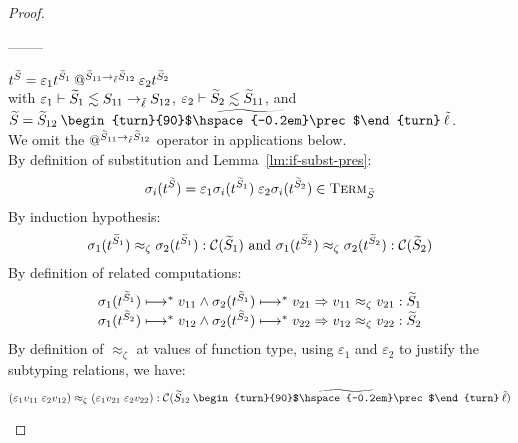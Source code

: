 \documentclass[authoryear,sort&compress,9pt,twocolumn,nocopyrightspace]{sigplanconf}
\makeatletter
\newcommand{\oblset}[1]{\textsc{#1}}
\newcommand{\csub}{\lesssim}
\newcommand{\?}{\textsf{\upshape ?}} \newcommand{\consistent}[1]{\widetilde{#1}}
\newcommand{\ljoincore}{\begin{turn}{90}$\hspace{-0.2em}\prec$\end{turn}}
\newcommand{\cjoin}{\mathbin{\consistent{\ljoincore}}}
\newcommand{\cljoin}{\cjoin}
\newcommand{\TermT}[1]{\oblset{Term}_{#1}}
\newcommand{\cast}[2]{\evcast{\evpr{#1}}{#2}}
\newcommand{\red}{\longmapsto}
\newcommand{\iapp}[1]{\mathbin{@^{#1}}}
\newcommand{\ev}{\varepsilon}
\newcommand{\evcast}[2]{#1#2}
\newcommand{\evpr}[1]{\braket{#1}}
\newcommand{\lobs}{\zeta}
\newcommand{\rel}{\approx_{\lobs}}
\newcommand{\rcomp}[1]{\mathcal{C}(#1)}
\newcommand{\subst}{\sigma}
\newcommand{\itm}[1]{{t^{\cS_{#1}}}}
\renewcommand{\cast}[2]{#1#2}
\makeatother
\begin{document}
\begin{proof}
\begin{case}[$\oplus$]
\end{case}

\begin{center}--------\end{center}
\begin{case}[app]

$\itm{} = \cast{\ev_1}{\itm{1}} \iapp{\cS_{11} ->_\clx \cS_{12}}  \cast{\ev_2}{\itm{2}}$ \\
with $\ev_1 |- \cS_1 \csub S_{11} ->_{\clx} S_{12}$, $\ev_2 |- \cS_2
\csub \cS_{11}$,  
and $\cS = \cS_{12} \cljoin \clx$.\\
We omit the $\iapp{\cS_{11} ->_\clx \cS_{12}}$ operator in applications below.\\[0.3em]

\noindent By definition of substitution and Lemma~\ref{lm:if-subst-pres}:
\begin{displaymath}
\subst_i(\itm{}) = 
\cast{\ev_1}{\subst_i(\itm{1})} \;
\cast{\ev_2}{\subst_i(\itm{2})} \in \TermT{\cS}
\end{displaymath}
By induction hypothesis:
\begin{displaymath}
\subst_1(\itm{1}) \rel \subst_2(\itm{1}) : \rcomp{\cS_1} \text{ and }
\subst_1(\itm{2}) \rel \subst_2(\itm{2}) : \rcomp{\cS_2}
\end{displaymath}
By definition of related computations:
\begin{displaymath}
\begin{array}{c}
\subst_1(\itm{1}) \red^{*} v_{11} \wedge \subst_2(\itm{1}) \red^{*} v_{21}
=> v_{11} \rel v_{21} : \cS_1 \\
\subst_1(\itm{2}) \red^{*} v_{12} \wedge \subst_2(\itm{2}) \red^{*} v_{22}
=> v_{12} \rel v_{22} : \cS_2
\end{array}
\end{displaymath}
By definition of $\rel$ at values of function type, using $\ev_1$ and
$\ev_2$ to justify the subtyping relations, we have:
\begin{displaymath}
 (\cast{\ev_1}{v_{11}} \; \cast{\ev_2}{v_{12}}) \rel 
  (\cast{\ev_1}{v_{21}} \; \cast{\ev_2}{v_{22}})  : \rcomp{\cS_{12}
    \cljoin \clx}
\end{displaymath}
\end{case}


\end{proof}
\end{document}
